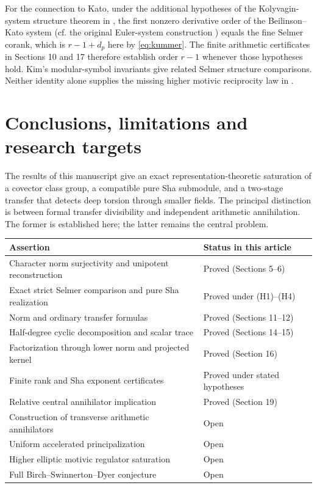 \documentclass[11pt,a4paper]{article}
\theoremstyle{definition}\newtheorem{definition}[theorem]{Definition}
\theoremstyle{remark}\newtheorem{remark}[theorem]{Remark}
\numberwithin{equation}{section}
\begin{document}
For the connection to Kato, under the additional hypotheses of the Kolyvagin-system structure theorem in \cite{BCGS}, the first nonzero derivative order of the Beilinson--Kato system (cf. the original Euler-system construction \cite{Kato}) equals the fine Selmer corank, which is $r-1+d_p$ here by \eqref{eq:kummer}. The finite arithmetic certificates in Sections 10 and 17 therefore establish order $r-1$ whenever those hypotheses hold. Kim's modular-symbol invariants \cite{Kim} give related Selmer structure comparisons. Neither identity alone supplies the missing higher motivic reciprocity law in \cite{BKS}.
\clearpage
\section{Conclusions, limitations and research targets}
The results of this manuscript give an exact representation-theoretic saturation of a covector class group, a compatible pure Sha submodule, and a two-stage transfer that detects deep torsion through smaller fields. The principal distinction is between formal transfer divisibility and independent arithmetic annihilation. The former is established here; the latter remains the central problem.

\small
\noindent\begin{tabularx}{\textwidth}{@{}p{}X@{}}
\toprule
\textbf{Assertion} & \textbf{Status in this article}\\\midrule
Character norm surjectivity and unipotent reconstruction & Proved (Sections 5--6)\\
Exact strict Selmer comparison and pure Sha realization & Proved under (H1)--(H4)\\
Norm and ordinary transfer formulas & Proved (Sections 11--12)\\
Half-degree cyclic decomposition and scalar trace & Proved (Sections 14--15)\\
Factorization through lower norm and projected kernel & Proved (Section 16)\\
Finite rank and Sha exponent certificates & Proved under stated hypotheses\\
Relative central annihilator implication & Proved (Section 19)\\
Construction of transverse arithmetic annihilators & Open\\
Uniform accelerated principalization & Open\\
Higher elliptic motivic regulator saturation & Open\\
Full Birch--Swinnerton--Dyer conjecture & Open\\\bottomrule
\end{tabularx}
\normalsize
\end{document}
